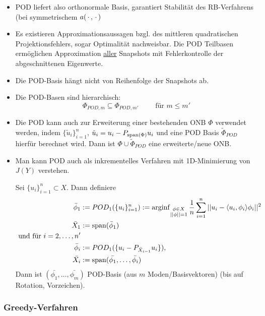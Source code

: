 \begin{bem}[Zusammenfassung] \beginwithlistbem
	\begin{itemize}
		\item POD liefert also orthonormale Basis, garantiert Stabilität des RB-Verfahrens (bei symmetrischem $a(\,\cdot\,,\,\cdot\,)$
		\item Es existieren Approximationsaussagen bzgl. des mittleren quadratischen Projektionsfehlers, sogar Optimalität nachweisbar.
		Die POD Teilbasen ermöglichen Approximation \underline{aller} Snapshots mit Fehlerkontrolle der abgeschnittenen Eigenwerte.
		\item Die POD-Basis hängt nicht von Reihenfolge der Snapshots ab.
		\item Die POD-Basen sind hierarchisch:
		\[
			\Phi_{POD,m} \subseteq \Phi_{POD,m'} \qquad \text{ für } m \leq m'
		\]
		\item Die POD kann auch zur Erweiterung einer bestehenden ONB $\Phi$ verwendet werden, indem $\{\tilde{u}_i\}_{i=1}^n$, $\tilde{u}_i = u_i - P_{\operatorname{span}(\Phi)} u_i$ und eine POD Basis $\tilde{\Phi}_{POD}$ hierfür berechnet wird. Dann ist $\Phi \cup \tilde{\Phi}_{POD}$ eine erweiterte/neue ONB.
		\item Man kann POD auch als inkrementelles Verfahren mit 1D-Minimierung von $J(Y)$ verstehen.
		
		Sei $\{u_i\}_{i=1}^n \subset X$. Dann definiere
		\begin{align*}
			\bar{\phi}_1 &:= POD_1 (\{u_i\}_{i=1}^n) := \op{arg inf}\limits_{\substack{\phi \in X \\ ||\phi||=1}} \frac{1}{n} \sum\limits_{i=1}^n ||u_i - \dotp{u_i}{\phi_i} \phi_i||^2 \\
			\bar{X}_1 &:= \op{span} (\bar{\phi}_1) \\
			\text{ und für } i=2,\dots,n' \\
			\bar{\phi}_i &:= POD_1(\{u_i - P_{\bar{X}_{i-1}}u_i\}), \\
			\bar{X_i} &:= \op{span} (\bar{\phi_1},\dots,\bar{\phi_i})
		\end{align*}
		Dann ist $(\bar{\phi_1},\dots,\bar{\phi_m})$ POD-Basis (aus $m$ Moden/Basisvektoren) (bis auf Rotation, Vorzeichen).
	\end{itemize}
\end{bem}

\subsubsection*{Greedy-Verfahren}

